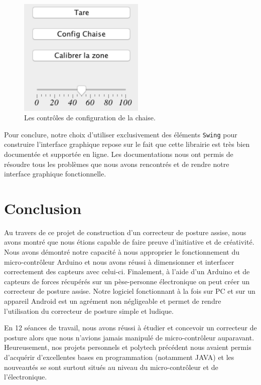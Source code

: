 \documentclass{polytech/polytech}
\begin{document}
\begin{figure}[htbp]
\begin{center}
\includegraphics[width=6cm]{image/app_pc_chaise}
\end{center}
\caption{Les contrôles de configuration de la chaise.}
\label{fig:app_pc_chaise}
\end{figure}

Pour conclure, notre choix d'utiliser exclusivement des éléments \texttt{Swing} pour construire l'interface graphique repose sur le fait que cette librairie est très bien documentée et supportée en ligne.
Les documentations nous ont permis de résoudre tous les problèmes que nous avons rencontrés et de rendre notre interface graphique fonctionnelle.


\chapter*{Conclusion}


Au travers de ce projet de construction d'un correcteur de posture assise, nous avons montré que nous étions capable de faire preuve d'initiative et de créativité.
Nous avons démontré notre capacité à nous approprier le fonctionnement du micro-contrôleur Arduino et nous avons réussi à dimensionner et interfacer correctement des capteurs avec celui-ci.
Finalement, à l'aide d'un Arduino et de capteurs de forces récupérés sur un pèse-personne électronique on peut créer un correcteur de posture assise.
Notre logiciel fonctionnant à la fois sur PC et sur un appareil Android est un agrément non négligeable et permet de rendre l'utilisation du correcteur de posture simple et ludique.

En 12 séances de travail, nous avons réussi à étudier et concevoir un correcteur de posture alors que nous n'avions jamais manipulé de micro-contrôleur auparavant.
Heureusement, nos projets personnels et polytech précédent nous avaient permis d'acquérir d'excellentes bases en programmation (notamment JAVA) et les nouveautés se sont surtout situés au niveau du micro-contrôleur et de l'électronique. 
\end{document}
